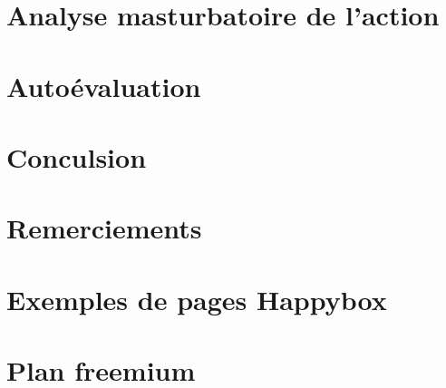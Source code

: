 \documentclass[11pt, a4paper ]{article}
\let\stdsection\section
\renewcommand\section{\newpage\stdsection}
\begin{document}
		\section{Analyse masturbatoire de l'action} %

		\section{Autoévaluation}

	\section{Conculsion} %

	\section{Remerciements}

	\appendix
	\section{Exemples de pages Happybox}

	\section{Plan freemium}
	\printindex

	
	
\end{document}
